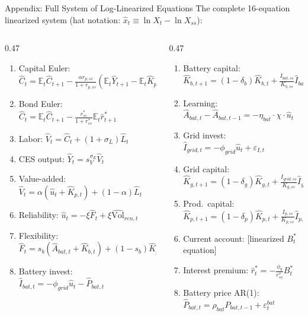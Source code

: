 \documentclass[aspectratio=169,10pt]{beamer}
\begin{document}
\begin{frame}{Appendix: Full System of Log-Linearized Equations}
  \small
  The complete 16-equation linearized system (hat notation: $\hat{x}_t \equiv \ln X_t - \ln X_{ss}$):
  \begin{columns}[T]
    \begin{column}{0.47\textwidth}
      \begin{enumerate}\scriptsize
        \item Capital Euler: $\hat{C}_t = \mathbb{E}_t\hat{C}_{t+1} - \frac{\alpha r_{p,ss}}{1+r_{p,ss}}(\mathbb{E}_t\hat{Y}_{t+1}-\mathbb{E}_t\hat{K}_{p,t+1})$
        \item Bond Euler: $\hat{C}_t = \mathbb{E}_t\hat{C}_{t+1} - \frac{r^*_{ss}}{1+r^*_{ss}}\mathbb{E}_t\hat{r}^*_{t+1}$
        \item Labor: $\hat{V}_t = \hat{C}_t + (1+\sigma_L)\hat{L}_t$
        \item CES output: $\hat{Y}_t = s_V^{\sigma_E}\hat{V}_t$
        \item Value-added: $\hat{V}_t = \alpha(\hat{u}_t+\hat{K}_{p,t})+(1-\alpha)\hat{L}_t$
        \item Reliability: $\hat{u}_t = -\xi\hat{F}_t + \xi\hat{\mathrm{Vol}}_{ren,t}$
        \item Flexibility: $\hat{F}_t = s_b(\hat{A}_{bat,t}+\hat{K}_{b,t})+(1-s_b)\hat{K}_{g,t}$
        \item Battery invest: $\hat{I}_{bat,t} = -\phi_{grid}\hat{u}_t - \hat{P}_{bat,t}$
      \end{enumerate}
    \end{column}
    \begin{column}{0.47\textwidth}
      \begin{enumerate}\scriptsize
        \setcounter{enumi}{8}
        \item Battery capital: $\hat{K}_{b,t+1}=(1-\delta_b)\hat{K}_{b,t}+\frac{I_{bat,ss}}{K_{b,ss}}\hat{I}_{bat,t}$
        \item Learning: $\hat{A}_{bat,t}-\hat{A}_{bat,t-1}=-\eta_{bat}\cdot\chi\cdot\hat{u}_t$
        \item Grid invest: $\hat{I}_{grid,t}=-\phi_{grid}\hat{u}_t+\varepsilon_{I,t}$
        \item Grid capital: $\hat{K}_{g,t+1}=(1-\delta_g)\hat{K}_{g,t}+\frac{I_{grid,ss}}{K_{g,ss}}\hat{I}_{grid,t}$
        \item Prod.\ capital: $\hat{K}_{p,t+1}=(1-\delta_p)\hat{K}_{p,t}+\frac{I_{p,ss}}{K_{p,ss}}\hat{I}_{p,t}$
        \item Current account: [linearized $B^*_t$ equation]
        \item Interest premium: $\hat{r}^*_t = -\frac{\phi_b}{r^*_{ss}}B^*_t$
        \item Battery price AR(1): $\hat{P}_{bat,t}=\rho_{bat}\hat{P}_{bat,t-1}+\varepsilon^{bat}_t$
      \end{enumerate}
    \end{column}
  \end{columns}
\end{frame}
\end{document}
